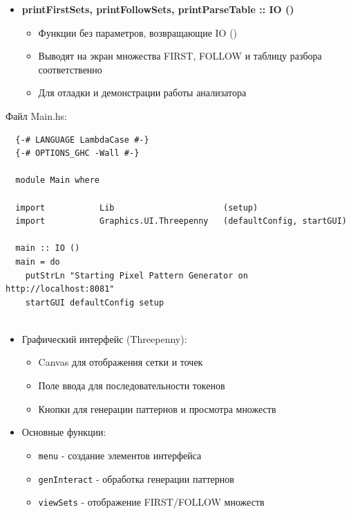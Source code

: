\documentclass[areasetadvanced]{scrartcl}
\begin{document}
\begin{itemize}
  \item \textbf{printFirstSets, printFollowSets, printParseTable :: IO ()}
  \begin{itemize}
    \item Функции без параметров, возвращающие IO ()
    \item Выводят на экран множества FIRST, FOLLOW и таблицу разбора соответственно
    \item Для отладки и демонстрации работы анализатора
  \end{itemize}
\end{itemize}

Файл Main.hs:
\begin{lstlisting}
  {-# LANGUAGE LambdaCase #-}
  {-# OPTIONS_GHC -Wall #-}
  
  module Main where
  
  import           Lib                      (setup)
  import           Graphics.UI.Threepenny   (defaultConfig, startGUI)
  
  main :: IO ()
  main = do
    putStrLn "Starting Pixel Pattern Generator on http://localhost:8081"
    startGUI defaultConfig setup
   
\end{lstlisting}

\begin{itemize}
    \item Графический интерфейс (Threepenny):
    \begin{itemize}
        \item Canvas для отображения сетки и точек
        \item Поле ввода для последовательности токенов
        \item Кнопки для генерации паттернов и просмотра множеств
    \end{itemize}
    
    \item Основные функции:
    \begin{itemize}
        \item \texttt{menu} - создание элементов интерфейса
        \item \texttt{genInteract} - обработка генерации паттернов
        \item \texttt{viewSets} - отображение FIRST/FOLLOW множеств
    \end{itemize}
\end{itemize}
\end{document}
